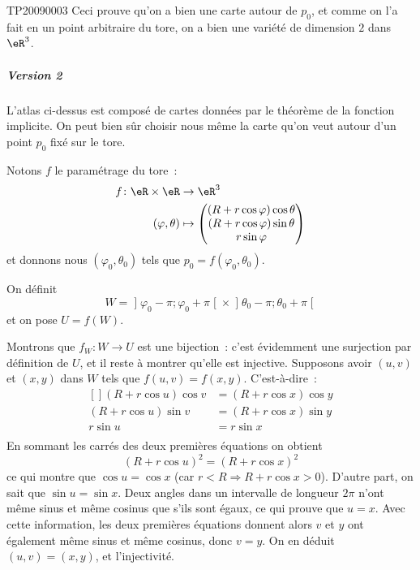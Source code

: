 \begin{corrige}{TP20090003}
	Ceci prouve qu'on a bien une carte autour de $p_0$, et comme on l'a
	fait en un point arbitraire du tore, on a bien une variété de
	dimension $2$ dans $\eR^3$.

	\subparagraph{Version 2} L'atlas ci-dessus est composé de cartes
	données par le théorème de la fonction implicite. On peut bien sûr
	choisir nous même la carte qu'on veut autour d'un point $p_0$ fixé sur
	le tore.

	Notons $f$ le paramétrage du tore~:
	\begin{equation}
		\begin{aligned}
			f\colon \eR\times\eR & \to \eR^3                          \\
			(\varphi,\theta)     & \mapsto \begin{pmatrix}
				                               (R+r\cos\varphi)\cos\theta \\
				                               (R+r\cos\varphi)\sin\theta \\
				                               r\sin\varphi
			                               \end{pmatrix}
		\end{aligned}
	\end{equation}
	et donnons nous $(\varphi_0,\theta_0)$ tels que $p_0 =
		f(\varphi_0,\theta_0)$.

	On définit
	\begin{equation*}
		W = \mathopen]\varphi_0 - \pi; \varphi_0 + \pi\mathclose[
			\times \mathopen]\theta_0 - \pi; \theta_0 + \pi\mathclose[
	\end{equation*}
	et on pose $U = f(W)$.

	Montrons que $f_W : W \to U$ est une bijection~: c'est évidemment
	une surjection par définition de $U$, et il reste à montrer qu'elle
	est injective. Supposons avoir $(u,v)$ et $(x,y)$ dans $W$ tels que
	$f(u,v) = f(x,y)$. C'est-à-dire~:
	\begin{equation}
		\begin{aligned}[]
			(R + r\cos u) \cos v & = (R + r\cos x) \cos y \\
			(R + r\cos u) \sin v & = (R + r\cos x) \sin y \\
			r \sin u             & = r \sin x             \\
		\end{aligned}
	\end{equation}
	En sommant les carrés des deux premières équations on obtient
	\begin{equation*}
		(R + r\cos u)^2 = (R + r\cos x)^2
	\end{equation*}
	ce qui montre que $\cos u = \cos x$ (car $r < R \Rightarrow R + r\cos
		x > 0$). D'autre part, on sait que $\sin u = \sin x$. Deux angles dans
	un intervalle de longueur $2 \pi$ n'ont même sinus et même cosinus que
	s'ils sont égaux, ce qui prouve que $u = x$. Avec cette information,
	les deux premières équations donnent alors $v$ et $y$ ont également
	même sinus et même cosinus, donc $v = y$. On en déduit $(u,v) =
		(x,y)$, et l'injectivité.


\end{corrige}
